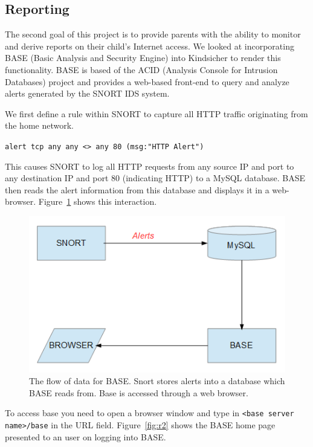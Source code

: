 
\subsection{Reporting}

The second goal of this project is to provide parents with the ability to
monitor and derive reports on their child's Internet access.
%
We looked at incorporating BASE (Basic Analysis and Security Engine) into
Kindsicher to render this functionality.
%
BASE is based of the ACID (Analysis Console for Intrusion Databases) project
and provides a web-based front-end to query and analyze alerts generated by the
SNORT IDS system.

We first define a rule within SNORT to capture all HTTP traffic originating
from the home network.

\verb+alert tcp any any <> any 80 (msg:"HTTP Alert")+

This causes SNORT to log all HTTP requests from any source IP and port to any
destination IP and port 80 (indicating HTTP) to a MySQL database.
%
BASE then reads the alert information from this database and displays it in a
web-browser. Figure~\ref{fig:r1} shows this interaction.

\begin{figure}[!t]
    \centering
    \includegraphics[width=\columnwidth]{figures/R1_BASE_Flow}
    \caption{The flow of data for BASE. Snort stores alerts into a database
    which BASE reads from. Base is accessed through a web browser.}
    \label{fig:r1}
\end{figure}

To access base you need to open a browser window and type in \texttt{<base server
name>/base} in the URL field.
%
Figure~\ref{fig:r2} shows the BASE home page presented to an user on logging
into BASE.

